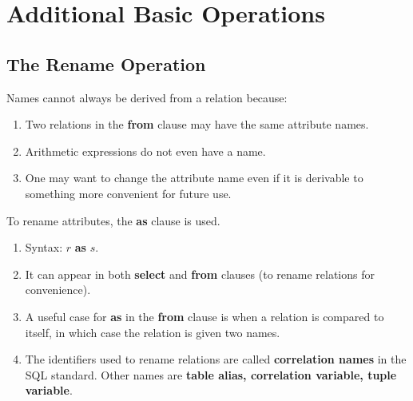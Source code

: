 \documentclass[journal,12pt,twocolumn]{IEEEtran}
\begin{document}
\section{Additional Basic Operations}

\subsection{The Rename Operation}

Names cannot always be derived from a relation because:
\begin{enumerate}
    \item Two relations in the \textbf{from} clause may have the same attribute 
    names.
    \item Arithmetic expressions do not even have a name.
    \item One may want to change the attribute name even if it is derivable to 
    something more convenient for future use.
\end{enumerate}

To rename attributes, the \textbf{as} clause is used.
\begin{enumerate}
    \item Syntax: $r$ \textbf{as} $s$.
    \item It can appear in both \textbf{select} and \textbf{from} clauses 
    (to rename relations for convenience).
    \item A useful case for \textbf{as} in the \textbf{from} clause is when a 
    relation is compared to itself, in which case the relation is given two 
    names.
    \item The identifiers used to rename relations are called 
    \textbf{correlation names} in the SQL standard. Other names are 
    \textbf{table alias, correlation variable, tuple variable}.
\end{enumerate}
\end{document}
